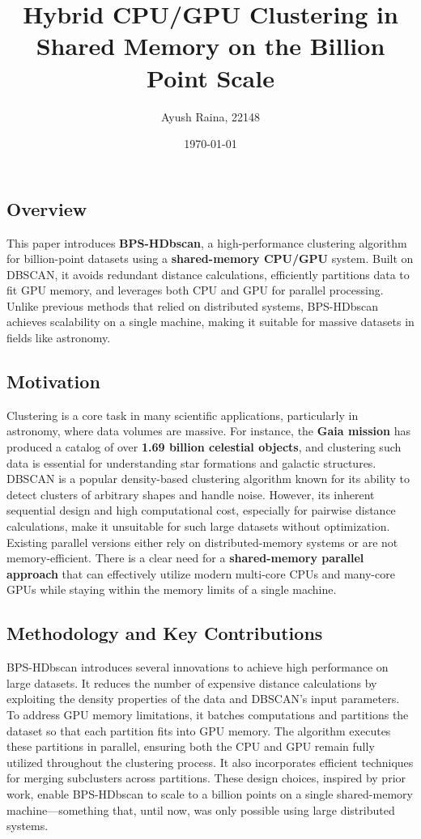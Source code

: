 \documentclass{article}
\title{Hybrid CPU/GPU Clustering in Shared Memory on the Billion Point Scale}
\author{Ayush Raina, 22148}
\date{\today}
\begin{document}
 

\maketitle

\subsection*{Overview}
This paper introduces \textbf{BPS-HDbscan}, a high-performance clustering algorithm for billion-point datasets using a \textbf{shared-memory CPU/GPU} system. Built on DBSCAN, it avoids redundant distance calculations, efficiently partitions data to fit GPU memory, and leverages both CPU and GPU for parallel processing. Unlike previous methods that relied on distributed systems, BPS-HDbscan achieves scalability on a single machine, making it suitable for massive datasets in fields like astronomy.

\subsection*{Motivation}
Clustering is a core task in many scientific applications, particularly in astronomy, where data volumes are massive. For instance, the \textbf{Gaia mission} has produced a catalog of over \textbf{1.69 billion celestial objects}, and clustering such data is essential for understanding star formations and galactic structures. DBSCAN is a popular density-based clustering algorithm known for its ability to detect clusters of arbitrary shapes and handle noise. However, its inherent sequential design and high computational cost, especially for pairwise distance calculations, make it unsuitable for such large datasets without optimization. Existing parallel versions either rely on distributed-memory systems or are not memory-efficient. There is a clear need for a \textbf{shared-memory parallel approach} that can effectively utilize modern multi-core CPUs and many-core GPUs while staying within the memory limits of a single machine.

\subsection*{Methodology and Key Contributions}
BPS-HDbscan introduces several innovations to achieve high performance on large datasets. It reduces the number of expensive distance calculations by exploiting the density properties of the data and DBSCAN's input parameters. To address GPU memory limitations, it batches computations and partitions the dataset so that each partition fits into GPU memory. The algorithm executes these partitions in parallel, ensuring both the CPU and GPU remain fully utilized throughout the clustering process. It also incorporates efficient techniques for merging subclusters across partitions. These design choices, inspired by prior work, enable BPS-HDbscan to scale to a billion points on a single shared-memory machine—something that, until now, was only possible using large distributed systems.
\end{document}
